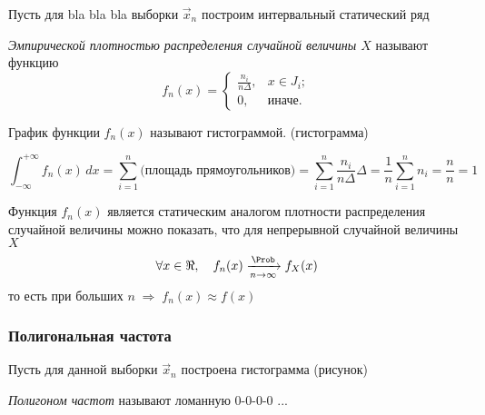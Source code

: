 Пусть для bla bla bla выборки $\vec{x}_n$ построим интервальный статический ряд

\begin{defn}
	\emph{Эмпирической плотностью распределения случайной величины $X$} называют функцию
	\begin{equation}
		f_n(x) =
		\begin{cases}
			\frac{n_i}{n \Delta}, &x \in J_i;\\
			0, &\text{иначе}.
		\end{cases}
	\end{equation}
\end{defn}

\begin{defn}
	График функции $f_n(x)$ называют гистограммой. (гистограмма)
\end{defn}

\begin{rem}
	\[
		\int_{-\infty}^{+\infty} f_n(x)\, dx = \sum_{i =1}^{n} \text{(площадь прямоугольников)} = \sum_{i = 1}^{n} \frac{n_i}{n \Delta} \Delta = \frac{1}{n} \sum_{i = 1}^{n} n_i = \frac{n}{n} = 1
	\]
\end{rem}
\begin{rem}
	Функция $f_n(x)$ является статическим аналогом плотности распределения случайной величины можно показать, что для непрерывной случайной величины $X$
	\[
		\forall x \in \Re, \quad f_n(x) \xrightarrow[n\to\infty]{\Prob} f_{X}(x)
	\]
	то есть при больших $n \;\Rightarrow\; f_n(x) \approx f(x)$
\end{rem}


\subsubsection{Полигональная частота}

Пусть для данной выборки $\vec{x}_n$ построена гистограмма (рисунок)

\begin{defn}
	\emph{Полигоном частот} называют ломанную 0-0-0-0 ...
\end{defn}